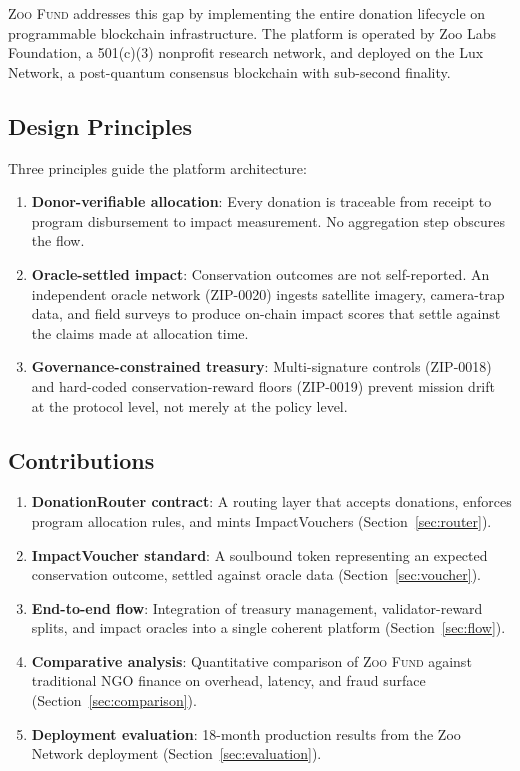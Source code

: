 \documentclass[11pt,letterpaper]{article}
\newcommand{\ZooFund}{\textsc{Zoo Fund}}
\begin{document}
\ZooFund{} addresses this gap by implementing the entire donation lifecycle on programmable blockchain infrastructure. The platform is operated by Zoo Labs Foundation, a 501(c)(3) nonprofit research network, and deployed on the Lux Network, a post-quantum consensus blockchain with sub-second finality.

\subsection{Design Principles}

Three principles guide the platform architecture:

\begin{enumerate}
    \item \textbf{Donor-verifiable allocation}: Every donation is traceable from receipt to program disbursement to impact measurement. No aggregation step obscures the flow.
    \item \textbf{Oracle-settled impact}: Conservation outcomes are not self-reported. An independent oracle network (ZIP-0020) ingests satellite imagery, camera-trap data, and field surveys to produce on-chain impact scores that settle against the claims made at allocation time.
    \item \textbf{Governance-constrained treasury}: Multi-signature controls (ZIP-0018) and hard-coded conservation-reward floors (ZIP-0019) prevent mission drift at the protocol level, not merely at the policy level.
\end{enumerate}

\subsection{Contributions}

\begin{enumerate}
    \item \textbf{DonationRouter contract}: A routing layer that accepts donations, enforces program allocation rules, and mints ImpactVouchers (Section~\ref{sec:router}).
    \item \textbf{ImpactVoucher standard}: A soulbound token representing an expected conservation outcome, settled against oracle data (Section~\ref{sec:voucher}).
    \item \textbf{End-to-end flow}: Integration of treasury management, validator-reward splits, and impact oracles into a single coherent platform (Section~\ref{sec:flow}).
    \item \textbf{Comparative analysis}: Quantitative comparison of \ZooFund{} against traditional NGO finance on overhead, latency, and fraud surface (Section~\ref{sec:comparison}).
    \item \textbf{Deployment evaluation}: 18-month production results from the Zoo Network deployment (Section~\ref{sec:evaluation}).
\end{enumerate}
\end{document}
